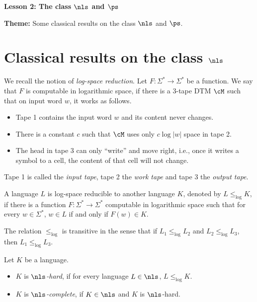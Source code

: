 \documentclass[11pt, a4paper]{article}
\renewcommand{\lesson}{2}
\renewcommand{\lessontitle}{The class $\nls$ and $\ps$}
\renewcommand{\fulltitle}{Lesson \lesson: \lessontitle}
\begin{document}
\date{}



\begin{center}
{\Large {\bf \fulltitle}}
\end{center}
\vspace{0.5cm}

\noindent
{\bf Theme:} Some classical results on the class $\nls$ and $\ps$.


\section{Classical results on the class $\nls$}

We recall the notion of {\em log-space reduction}.
Let $F:\Sigma^*\to\Sigma^*$ be a function.
We say that $F$ is computable in logarithmic space, 
if there is a 3-tape DTM $\cM$ such that on input word $w$,
it works as follows.
\begin{itemize}\itemsep=0pt
\item
Tape 1 contains the input word $w$ and its content never changes.
\item
There is a constant $c$ such that $\cM$ uses only $c\log |w|$ space in tape 2.
\item
The head in tape 3 can only ``write'' and move right, i.e.,
once it writes a symbol to a cell, the content of that cell will not change.
\end{itemize}
Tape 1 is called the {\em input tape}, tape 2 the {\em work tape} and tape 3 the {\em output tape}.

\begin{definition}
\label{def:log-space-reduction}
A language $L$ is log-space reducible to another language $K$,
denoted by $L\leq_{\log} K$, if
there is a function $F:\Sigma^*\to\Sigma^*$ computable in logarithmic space such that
for every $w\in \Sigma^*$, $w\in L$ if and only if $F(w)\in K$.
\end{definition}

\begin{remark}
The relation $\leq_{\log}$ is transitive in the sense that
if $L_1\leq_{\log} L_2$ and $L_2\leq_{\log} L_3$,
then $L_1\leq_{\log} L_3$.
\end{remark}


\begin{definition}
\label{def:nl-complete}
Let $K$ be a language.
\begin{itemize}\itemsep=0pt
\item
$K$ is {\em $\nls$-hard}, if for every language $L\in \nls$, $L\leq_{\log} K$.
\item
$K$ is {\em $\nls$-complete}, if $K \in \nls$ and $K$ is $\nls$-hard.
\end{itemize}
\end{definition}
\end{document}

